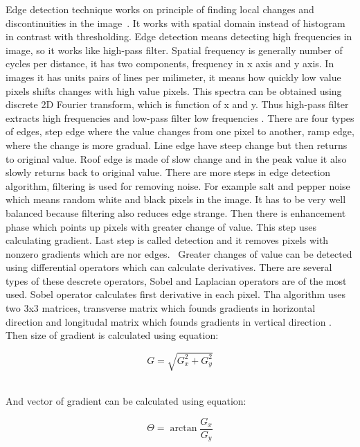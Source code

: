         Edge detection technique works on principle of finding local changes and discontinuities in the image~\cite{22}. It works with spatial domain instead of histogram in contrast with thresholding.
        Edge detection means detecting high frequencies in image, so it works like high-pass filter. Spatial frequency is generally number of cycles per distance, it has two components,
        frequency in x axis and y axis. In images it has units pairs of lines per milimeter, it means how quickly low value pixels shifts changes with high value pixels.
        This spectra can be obtained using discrete 2D Fourier transform, which is function of x and y. Thus high-pass filter extracts high frequencies and low-pass filter low frequencies \cite{23}.
        There are four types of edges, step edge where the value changes from one pixel to another, ramp edge, where the change is more gradual. Line edge have steep change
        but then returns to original value. Roof edge is made of slow change and in the peak value it also slowly returns back to original value.
        There are more steps in edge detection algorithm, filtering is used for removing noise. For example salt and pepper noise
        which means random white and black pixels in the image. It has to be very well balanced because filtering also reduces edge strange.
        Then there is enhancement phase which points up pixels with greater change of value. This step uses calculating gradient. Last step is called detection
        and it removes pixels with nonzero gradients which are nor edges.~\cite{3} Greater changes of value can be detected using differential operators which can calculate derivatives.
        There are several types of these descrete operators, Sobel and Laplacian operators are of the most used. Sobel operator calculates first derivative in each pixel.
        Tha algorithm uses two 3x3 matrices, transverse matrix which founds gradients in horizontal direction and longitudal matrix which founds gradients in vertical direction \cite{17, 22}.
        Then size of gradient is calculated using equation:

        \begin{equation}
            G = \sqrt{G_x^2 + G_y^2}
        \end{equation}~\cite{22}
        
        And vector of gradient can be calculated using equation:

        \begin{equation}
            \Theta = \arctan{\frac{G_x}{G_y}}
        \end{equation}~\cite{22}


